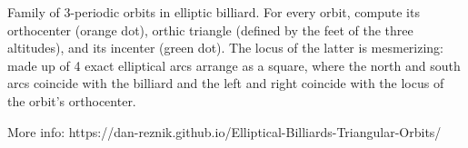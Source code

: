 Family of 3-periodic orbits in elliptic billiard. For every orbit, compute its orthocenter (orange dot), orthic triangle (defined by the feet of the three altitudes), and its incenter (green dot). The locus of the latter is mesmerizing: made up of 4 exact elliptical arcs arrange as a square, where the north and south arcs coincide with the billiard and the left and right coincide with the locus of the orbit's orthocenter.

More info: https://dan-reznik.github.io/Elliptical-Billiards-Triangular-Orbits/